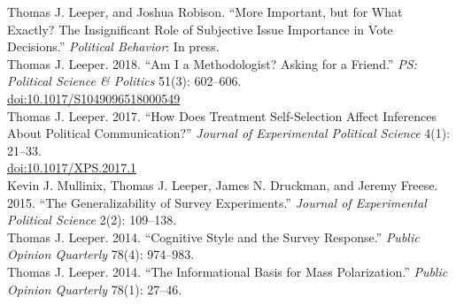 \documentclass[12pt]{article}
\renewcommand{\section}[1]{\pagebreak[3]%
    \llap{\scshape\smash{\parbox[t]{\marginparwidth}{\raggedright {\color{black}#1}}}}%
    \vspace{-\baselineskip}\par}
\newcommand{\entry}[1]{\indent {\color{lg}\guillemotright}\hspace{2pt}#1\vspace{.25em}\\}
\newcommand{\hzline}[0]{\noindent\makebox[\linewidth]{\rule{\textwidth}{0.4pt}}}
\begin{document}
\clearpage

\hzline

\section{Selected\\Peer-Reviewed\\Publications}

	\entry{Thomas J. Leeper, and Joshua Robison. ``More Important, but for What Exactly? The Insignificant Role of Subjective Issue Importance in Vote Decisions.'' \textit{Political Behavior}: In press.}
	\entry{Thomas J. Leeper. 2018. ``Am I a Methodologist? Asking for a Friend.'' \textit{PS: Political Science \& Politics} 51(3): 602--606.\\ \href{https://doi.org/10.1017/S1049096518000549}{doi:10.1017/S1049096518000549}}
    \entry{Thomas J. Leeper. 2017. ``How Does Treatment Self-Selection Affect Inferences About Political Communication?'' \textit{Journal of Experimental Political Science} 4(1): 21--33.\\ \href{http://doi.org/10.1017/XPS.2017.1}{doi:10.1017/XPS.2017.1}}	
	\entry{Kevin J. Mullinix, Thomas J. Leeper, James N. Druckman, and Jeremy Freese. 2015. ``The Generalizability of Survey Experiments.'' {\em Journal of Experimental Political Science} 2(2): 109--138.}
	\entry{Thomas J. Leeper. 2014. ``Cognitive Style and the Survey Response.'' {\em Public Opinion Quarterly} 78(4): 974--983.}
	\entry{Thomas J. Leeper. 2014. ``The Informational Basis for Mass Polarization.'' {\em Public Opinion Quarterly} 78(1): 27--46.}
\end{document}
